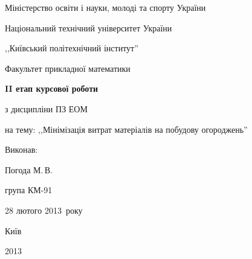 \documentclass[utf8,ukrainian]{eskdtext}
\begin{document}
\begin{titlepage}
    \Large
    \begin{center}
        Міністерство освіти і науки, молоді та спорту України

        Національний технічний університет України

        ,,Київський політехнічний інститут''

        \vspace*{1cm}

        Факультет прикладної математики

        \vspace*{3.5cm}

        \textbf{II етап курсової роботи}

        з дисципліни ПЗ ЕОМ

        на тему: ,,Мінімізація витрат матеріалів на побудову огороджень''
    \end{center}

    \vspace*{4cm}

    Виконав:\hfill
        \begin{minipage}{0.3\textwidth}
            Погода М.\,В.

            група КМ-91
        \end{minipage}

    \vspace*{1cm}

    \hfill 28 лютого 2013~року

    \vfill

    \begin{center}
        \Large
        Київ

        2013
    \end{center}
\end{titlepage}
\end{document}
